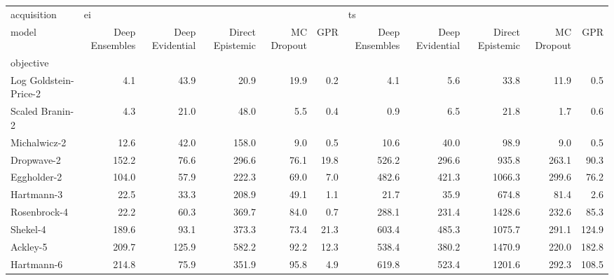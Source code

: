 \begin{tabular}{lrrrrrrrrrr}
\toprule
acquisition & \multicolumn{5}{l}{ei} & \multicolumn{5}{l}{ts} \\
model & Deep Ensembles & Deep Evidential & Direct Epistemic & MC Dropout &   GPR & Deep Ensembles & Deep Evidential & Direct Epistemic & MC Dropout &    GPR \\
objective             &                &                 &                  &            &       &                &                 &                  &            &        \\
\midrule
Log Goldstein-Price-2 &            4.1 &            43.9 &             20.9 &       19.9 &   0.2 &            4.1 &             5.6 &             33.8 &       11.9 &    0.5 \\
Scaled Branin-2       &            4.3 &            21.0 &             48.0 &        5.5 &   0.4 &            0.9 &             6.5 &             21.8 &        1.7 &    0.6 \\
Michalwicz-2          &           12.6 &            42.0 &            158.0 &        9.0 &   0.5 &           10.6 &            40.0 &             98.9 &        9.0 &    0.5 \\
Dropwave-2            &          152.2 &            76.6 &            296.6 &       76.1 &  19.8 &          526.2 &           296.6 &            935.8 &      263.1 &   90.3 \\
Eggholder-2           &          104.0 &            57.9 &            222.3 &       69.0 &   7.0 &          482.6 &           421.3 &           1066.3 &      299.6 &   76.2 \\
Hartmann-3            &           22.5 &            33.3 &            208.9 &       49.1 &   1.1 &           21.7 &            35.9 &            674.8 &       81.4 &    2.6 \\
Rosenbrock-4          &           22.2 &            60.3 &            369.7 &       84.0 &   0.7 &          288.1 &           231.4 &           1428.6 &      232.6 &   85.3 \\
Shekel-4              &          189.6 &            93.1 &            373.3 &       73.4 &  21.3 &          603.4 &           485.3 &           1075.7 &      291.1 &  124.9 \\
Ackley-5              &          209.7 &           125.9 &            582.2 &       92.2 &  12.3 &          538.4 &           380.2 &           1470.9 &      220.0 &  182.8 \\
Hartmann-6            &          214.8 &            75.9 &            351.9 &       95.8 &   4.9 &          619.8 &           523.4 &           1201.6 &      292.3 &  108.5 \\
\bottomrule
\end{tabular}
